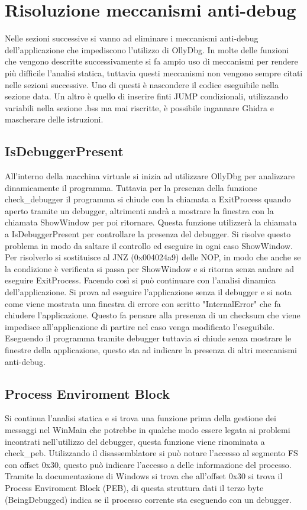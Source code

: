 \documentclass[a4paper,12pt]{article}
\begin{document}
\section{Risoluzione meccanismi anti-debug}
Nelle sezioni successive si vanno ad eliminare i meccanismi anti-debug dell'applicazione che impediscono l'utilizzo di OllyDbg. In molte delle funzioni che vengono descritte successivamente si fa ampio uso di meccanismi per rendere più difficile l'analisi statica, tuttavia questi meccanismi non vengono sempre citati nelle sezioni successive. Uno di questi è nascondere il codice eseguibile nella sezione data. Un altro è quello di inserire finti JUMP condizionali, utilizzando variabili nella sezione .bss ma mai riscritte, è possibile ingannare Ghidra e mascherare delle istruzioni.

\subsection{IsDebuggerPresent}
All'interno della macchina virtuale si inizia ad utilizzare OllyDbg per analizzare dinamicamente il programma. Tuttavia per la presenza della funzione check\_debugger il programma si chiude con la chiamata a ExitProcess quando aperto tramite un debugger, altrimenti andrà a mostrare la finestra con la chiamata ShowWindow per poi ritornare.  Questa funzione utilizzerà la chiamata a IsDebuggerPresent per controllare la presenza del debugger.
Si risolve questo problema in modo da saltare il controllo ed eseguire in ogni caso ShowWindow. Per risolverlo si sostituisce al JNZ (0x004024a9) delle NOP, in modo che anche se la condizione è verificata si passa per ShowWindow e si ritorna senza andare ad eseguire ExitProcess.
 Facendo così si può continuare con l'analisi dinamica dell'applicazione. Si prova ad eseguire l'applicazione senza il debugger e si nota come viene mostrata una finestra di errore con scritto "InternalError" che fa chiudere l'applicazione. Questo fa pensare alla presenza di un checksum che viene impedisce all'applicazione di partire nel caso venga modificato l'eseguibile.  Eseguendo il programma tramite debugger tuttavia si chiude senza mostrare le finestre della applicazione, questo sta ad indicare la presenza di altri meccanismi anti-debug. 

\subsection{Process Enviroment Block}
Si continua l'analisi statica e si trova una funzione prima della gestione dei messaggi nel WinMain che potrebbe in qualche modo essere legata ai problemi incontrati nell'utilizzo del debugger, questa funzione viene rinominata a check\_peb. Utilizzando il disassemblatore si può notare l'accesso al segmento FS con offset 0x30, questo può indicare l'accesso a delle informazione del processo. Tramite la documentazione di Windows si trova che all'offset 0x30 si trova il Process Enviroment Block (PEB), di questa struttura dati il terzo byte (BeingDebugged) indica se il processo corrente sta eseguendo con un debugger.
\end{document}
